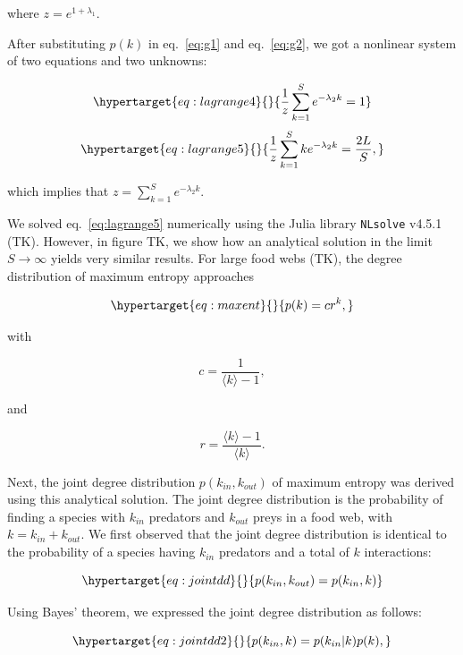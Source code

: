 \documentclass[10pt,oneside]{article}
\begin{document}
where \(z = e^{1+\lambda_1}\).

After substituting \(p(k)\) in eq.~\ref{eq:g1} and eq.~\ref{eq:g2}, we
got a nonlinear system of two equations and two unknowns:

\begin{equation}\protect\hypertarget{eq:lagrange4}{}{\frac{1}{z}\sum_{k=1}^{S}e^{-\lambda_2k} = 1}\label{eq:lagrange4}\end{equation}
\begin{equation}\protect\hypertarget{eq:lagrange5}{}{\frac{1}{z}\sum_{k=1}^{S}ke^{-\lambda_2k} = \frac{2L}{S},}\label{eq:lagrange5}\end{equation}

which implies that \(z = \sum_{k=1}^{S}e^{-\lambda_2k}\).

We solved eq.~\ref{eq:lagrange5} numerically using the Julia library
\texttt{NLsolve} v4.5.1 (TK). However, in figure TK, we show how an
analytical solution in the limit \(S \rightarrow \infty\) yields very
similar results. For large food webs (TK), the degree distribution of
maximum entropy approaches

\begin{equation}\protect\hypertarget{eq:maxent}{}{p(k) = c r^{k},}\label{eq:maxent}\end{equation}

with

\[c = \frac{{1}}{\langle k \rangle-1},\]

and

\[r = \frac{{\langle k \rangle-1}}{\langle k \rangle}.\]

Next, the joint degree distribution \(p(k_{in},k_{out})\) of maximum
entropy was derived using this analytical solution. The joint degree
distribution is the probability of finding a species with \(k_{in}\)
predators and \(k_{out}\) preys in a food web, with
\(k = k_{in} + k_{out}\). We first observed that the joint degree
distribution is identical to the probability of a species having
\(k_{in}\) predators and a total of \(k\) interactions:

\begin{equation}\protect\hypertarget{eq:jointdd}{}{p(k_{in},k_{out}) = p(k_{in},k)}\label{eq:jointdd}\end{equation}

Using Bayes' theorem, we expressed the joint degree distribution as
follows:

\begin{equation}\protect\hypertarget{eq:jointdd2}{}{p(k_{in},k) = p(k_{in}|k)p(k),}\label{eq:jointdd2}\end{equation}
\end{document}
